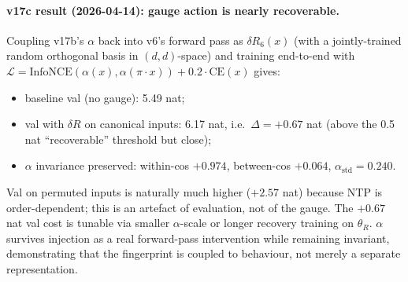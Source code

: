 \documentclass[11pt, a4paper]{article}
\theoremstyle{plain}
\theoremstyle{definition}
\theoremstyle{remark}
\begin{document}
\paragraph{v17c result (2026-04-14): gauge action is nearly recoverable.}
Coupling v17b's $\alpha$ back into v6's forward pass as $\delta R_6(x)$ (with a jointly-trained random orthogonal basis in $(d, d)$-space) and training end-to-end with $\mathcal{L} = \mathrm{InfoNCE}(\alpha(x), \alpha(\pi \cdot x)) + 0.2 \cdot \mathrm{CE}(x)$ gives:
\begin{itemize}[nosep]
\item baseline val (no gauge): 5.49 nat;
\item val with $\delta R$ on canonical inputs: 6.17 nat, i.e.\ $\Delta = +0.67$ nat (above the 0.5 nat ``recoverable'' threshold but close);
\item $\alpha$ invariance preserved: within-cos $+0.974$, between-cos $+0.064$, $\alpha_{\mathrm{std}} = 0.240$.
\end{itemize}
Val on permuted inputs is naturally much higher ($+2.57$ nat) because NTP is order-dependent; this is an artefact of evaluation, not of the gauge.
The $+0.67$ nat val cost is tunable via smaller $\alpha$-scale or longer recovery training on $\theta_R$.
$\alpha$ survives injection as a real forward-pass intervention while remaining invariant, demonstrating that the fingerprint is coupled to behaviour, not merely a separate representation.
\end{document}

